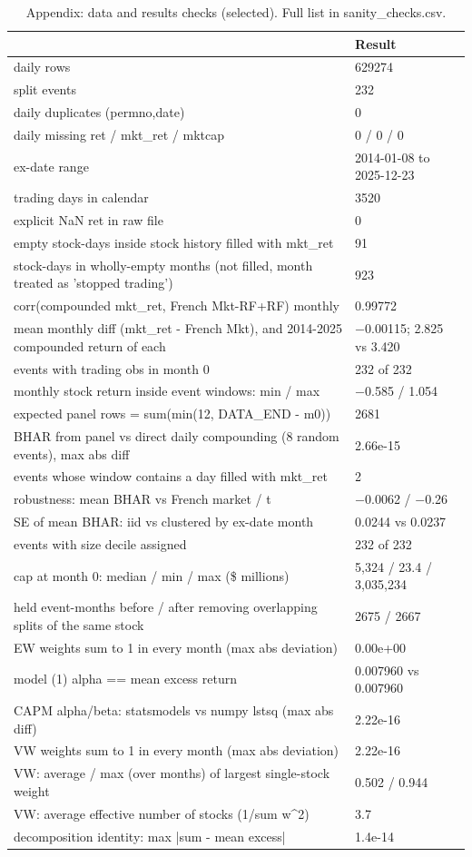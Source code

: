 \begin{table}[!htbp]
\centering
\small
\caption{Appendix: data and results checks (selected). Full list in sanity\_checks.csv.}
\label{tab:checks}
\begin{tabular}{p{9cm}p{6cm}}
\toprule
 & Result \\
\midrule
daily rows & 629274 \\
split events & 232 \\
daily duplicates (permno,date) & 0 \\
daily missing ret / mkt\_ret / mktcap & 0 / 0 / 0 \\
ex-date range & 2014-01-08 to 2025-12-23 \\
trading days in calendar & 3520 \\
explicit NaN ret in raw file & 0 \\
empty stock-days inside stock history filled with mkt\_ret & 91 \\
stock-days in wholly-empty months (not filled, month treated as 'stopped trading') & 923 \\
corr(compounded mkt\_ret, French Mkt-RF+RF) monthly & 0.99772 \\
mean monthly diff (mkt\_ret - French Mkt), and 2014-2025 compounded return of each & $-$0.00115; 2.825 vs 3.420 \\
events with trading obs in month 0 & 232 of 232 \\
monthly stock return inside event windows: min / max & $-$0.585 / 1.054 \\
expected panel rows = sum(min(12, DATA\_END - m0)) & 2681 \\
BHAR from panel vs direct daily compounding (8 random events), max abs diff & 2.66e-15 \\
events whose window contains a day filled with mkt\_ret & 2 \\
robustness: mean BHAR vs French market / t & $-$0.0062 / $-$0.26 \\
SE of mean BHAR: iid vs clustered by ex-date month & 0.0244 vs 0.0237 \\
events with size decile assigned & 232 of 232 \\
cap at month 0: median / min / max (\$ millions) & 5,324 / 23.4 / 3,035,234 \\
held event-months before / after removing overlapping splits of the same stock & 2675 / 2667 \\
EW weights sum to 1 in every month (max abs deviation) & 0.00e+00 \\
model (1) alpha == mean excess return & 0.007960 vs 0.007960 \\
CAPM alpha/beta: statsmodels vs numpy lstsq (max abs diff) & 2.22e-16 \\
VW weights sum to 1 in every month (max abs deviation) & 2.22e-16 \\
VW: average / max (over months) of largest single-stock weight & 0.502 / 0.944 \\
VW: average effective number of stocks (1/sum w\textasciicircum{}2) & 3.7 \\
decomposition identity: max |sum - mean excess| & 1.4e-14 \\
\bottomrule
\end{tabular}
\end{table}
